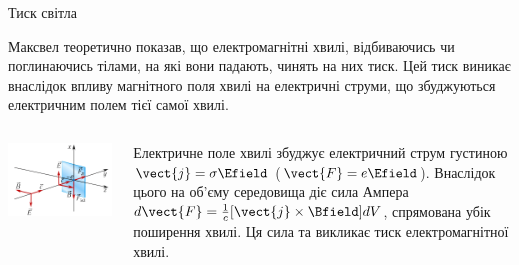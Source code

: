 \documentclass[onlytextwidth]{beamer}
\begin{document}




\begin{frame}{Тиск світла}{}\small
	\begin{block}{}\justifying
		Максвел теоретично показав, що електромагнітні хвилі, відбиваючись чи поглинаючись тілами, на які  вони падають, чинять на них тиск. Цей тиск виникає внаслідок впливу магнітного поля хвилі на електричні струми, що збуджуються електричним полем тієї самої хвилі.
	\end{block}
	\begin{columns}
		\begin{column}{0.3\linewidth}
			\begin{center}
				\includegraphics[width=1\linewidth]{pictures/elmagpresure}
			\end{center}
		\end{column}
		\begin{column}{0.7\linewidth}
			\begin{block}{}\justifying\small
				Електричне поле хвилі збуджує електричний струм густиною $ \vect{j} = \sigma\Efield $ ($ \vect{F} = e\Efield $). Внаслідок цього на
				об'єму середовища діє сила Ампера $ d\vect{F} = \frac1c[\vect{j}\times\Bfield] dV$, спрямована убік поширення хвилі. Ця сила та викликає
				тиск електромагнітної хвилі.
			\end{block}
		\end{column}
	\end{columns}
	\begin{block}{}\justifying\small

\end{block}
\end{frame}
\end{document}
